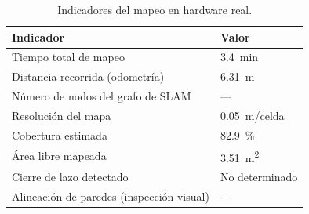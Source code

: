 \begin{table}[H]
\centering
\caption{Indicadores del mapeo en hardware real.}
\label{tab:slam_real_indicadores}
\begin{tabular}{ll}
\hline
\textbf{Indicador} & \textbf{Valor} \\
\hline
Tiempo total de mapeo                  & 3.4~min \\
Distancia recorrida (odometría)        & 6.31~m \\
Número de nodos del grafo de SLAM      & --- \\
Resolución del mapa                    & 0.05~m/celda \\
Cobertura estimada                     & 82.9~\% \\
Área libre mapeada                     & 3.51~m\textsuperscript{2} \\
Cierre de lazo detectado               & No determinado \\
Alineaci\'on de paredes (inspecci\'on visual) & --- \\
\hline
\end{tabular}
\end{table}